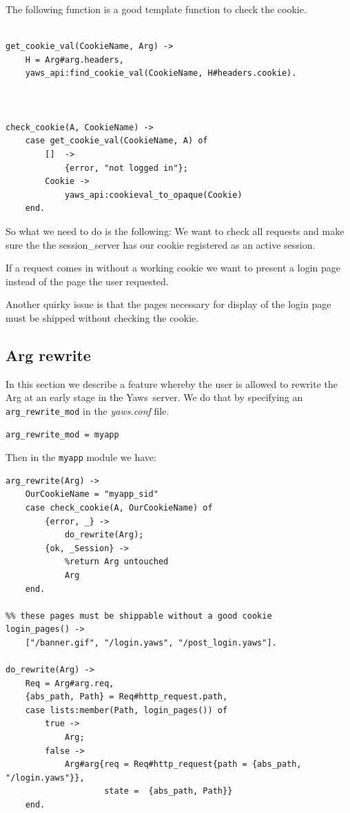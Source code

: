 \documentclass[11pt,oneside,english]{book}
\newcommand{\Yaws}            %
        {{\sc Yaws}}
\begin{document}
The following function is a good template function to
check the cookie.


\begin{verbatim}

get_cookie_val(CookieName, Arg) ->
    H = Arg#arg.headers,
    yaws_api:find_cookie_val(CookieName, H#headers.cookie).



check_cookie(A, CookieName) ->
    case get_cookie_val(CookieName, A) of
        []  ->
            {error, "not logged in"};
        Cookie ->
            yaws_api:cookieval_to_opaque(Cookie)
    end.

\end{verbatim}


So what we need to do is the following: We want to check all
requests and make sure the the session\_server has our cookie registered as
an active session.

If a request comes in without a working cookie we want to present
a login page instead of the page the user requested.

Another quirky issue is that the pages necessary for display of the
login page must be shipped without checking the cookie.

  \subsection{Arg rewrite}

In this section we describe a feature whereby the user is allowed to
rewrite the Arg at an early stage in the \Yaws\  server.
We do that by specifying an \verb+arg_rewrite_mod+ in the \textit{yaws.conf} file.
\begin{verbatim}
arg_rewrite_mod = myapp
\end{verbatim}


Then in the \verb+myapp+ module we have:

\begin{verbatim}
arg_rewrite(Arg) ->
    OurCookieName = "myapp_sid"
    case check_cookie(A, OurCookieName) of
        {error, _} ->
            do_rewrite(Arg);
        {ok, _Session} ->
            %return Arg untouched
            Arg
    end.

%% these pages must be shippable without a good cookie
login_pages() ->
    ["/banner.gif", "/login.yaws", "/post_login.yaws"].

do_rewrite(Arg) ->
    Req = Arg#arg.req,
    {abs_path, Path} = Req#http_request.path,
    case lists:member(Path, login_pages()) of
        true ->
            Arg;
        false ->
            Arg#arg{req = Req#http_request{path = {abs_path, "/login.yaws"}},
                    state =  {abs_path, Path}}
    end.

\end{verbatim}
\end{document}
